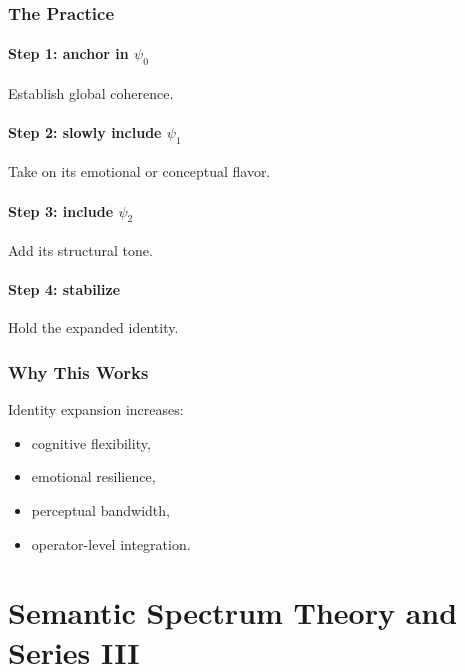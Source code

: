 \documentclass[12pt]{article}
\begin{document}
\section{The Practice}

\subsection*{Step 1: anchor in $\psi_0$}

Establish global coherence.

\subsection*{Step 2: slowly include $\psi_1$}

Take on its emotional or conceptual flavor.

\subsection*{Step 3: include $\psi_2$}

Add its structural tone.

\subsection*{Step 4: stabilize}

Hold the expanded identity.

\section{Why This Works}

Identity expansion increases:

\begin{itemize}
    \item cognitive flexibility,
    \item emotional resilience,
    \item perceptual bandwidth,
    \item operator-level integration.
\end{itemize}


\part{Semantic Spectrum Theory and Series III}
\end{document}

